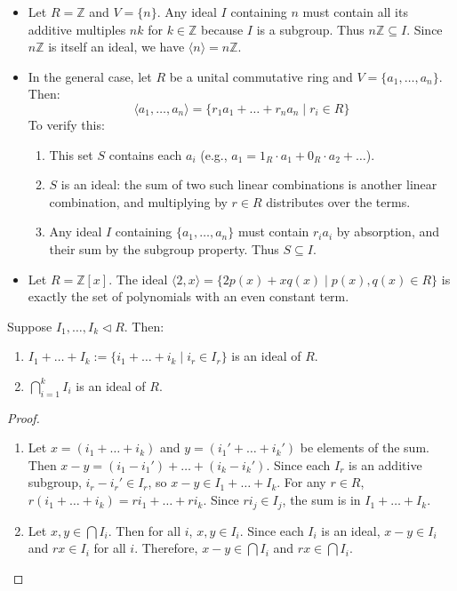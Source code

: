 \begin{example}
\begin{itemize}
    \item Let $R = \mathbb{Z}$ and $V = \{n\}$. Any ideal $I$ containing $n$ must contain all its additive multiples $nk$ for $k \in \mathbb{Z}$ because $I$ is a subgroup. Thus $n\mathbb{Z} \subseteq I$. Since $n\mathbb{Z}$ is itself an ideal, we have $\langle n \rangle = n\mathbb{Z}$.
    \item In the general case, let $R$ be a unital commutative ring and $V = \{a_1, \dots, a_n\}$. Then:
    \[ \langle a_1, \dots, a_n \rangle = \{ r_1a_1 + \dots + r_na_n \mid r_i \in R \} \]
    To verify this:
    \begin{enumerate}
        \item This set $S$ contains each $a_i$ (e.g., $a_1 = 1_R\cdot a_1 + 0_R \cdot a_2 + \dots$).
        \item $S$ is an ideal: the sum of two such linear combinations is another linear combination, and multiplying by $r \in R$ distributes over the terms.
        \item Any ideal $I$ containing $\{a_1, \dots, a_n\}$ must contain $r_i a_i$ by absorption, and their sum by the subgroup property. Thus $S \subseteq I$.
    \end{enumerate}
    \item Let $R = \mathbb{Z}[x]$. The ideal $\langle 2, x \rangle = \{ 2p(x) + xq(x) \mid p(x), q(x) \in R \}$ is exactly the set of polynomials with an even constant term.
\end{itemize}
\end{example}

\begin{lemma}
Suppose $I_1, \dots, I_k \triangleleft R$. Then:
\begin{enumerate}
    \item $I_1 + \dots + I_k := \{ i_1 + \dots + i_k \mid i_r \in I_r \}$ is an ideal of $R$.
    \item $\bigcap_{i=1}^k I_i$ is an ideal of $R$.
\end{enumerate}
\end{lemma}

\begin{proof}
\begin{enumerate}
    \item Let $x = (i_1 + \dots + i_k)$ and $y = (i_1' + \dots + i_k')$ be elements of the sum. 
    Then $x - y = (i_1 - i_1') + \dots + (i_k - i_k')$. Since each $I_r$ is an additive subgroup, $i_r - i_r' \in I_r$, so $x - y \in I_1 + \dots + I_k$.
    For any $r \in R$, $r(i_1 + \dots + i_k) = ri_1 + \dots + ri_k$. Since $ri_j \in I_j$, the sum is in $I_1 + \dots + I_k$.
    \item Let $x, y \in \bigcap I_i$. Then for all $i$, $x, y \in I_i$. Since each $I_i$ is an ideal, $x-y \in I_i$ and $rx \in I_i$ for all $i$. Therefore, $x-y \in \bigcap I_i$ and $rx \in \bigcap I_i$.
\end{enumerate}
\end{proof}


